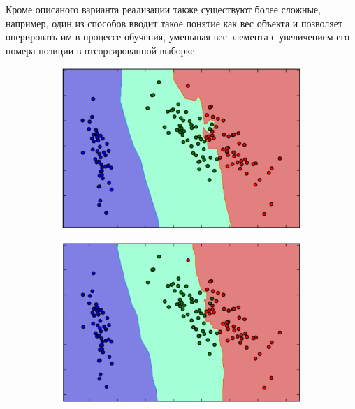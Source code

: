 Кроме описаного варианта реализации также существуют более сложные, например, один из способов вводит такое понятие как вес объекта и позволяет оперировать им в процессе обучения, уменьшая вес элемента с увеличением его номера позиции в отсортированной выборке.

\newpage
\begin{figure}[ht]
	\centering
    \begin{subfigure}[b]{0.3\textwidth}
    \centering
        \includegraphics[scale=0.22]{pasted-image-21.png}
        \caption{}
    \end{subfigure}
 	\begin{subfigure}[b]{0.3\textwidth}
    \centering
        \includegraphics[scale=0.22]{pasted-image-23.png}
        \caption{}
    \end{subfigure}
    \begin{subfigure}[b]{0.3\textwidth}

\end{subfigure}
\end{figure}
